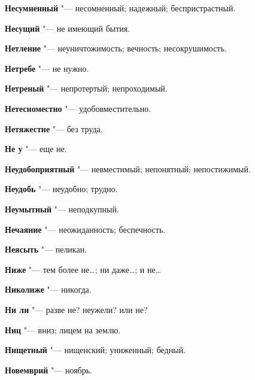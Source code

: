 \begin{mymulticols}{2}
\noindent\textbf{Несумненный} "--- несомненный; надежный; беспристрастный. 




\noindent\textbf{Несущий} "--- не имеющий бытия. 




\noindent\textbf{Нетление} "--- неуничтожимость; вечность; несокрушимость. 




\noindent\textbf{Нетребе} "--- не нужно. 




\noindent\textbf{Нетреный} "--- непротертый; непроходимый. 




\noindent\textbf{Нетесноместно} "--- удобовместительно. 




\noindent\textbf{Нетяжестне} "--- без труда. 




\noindent\textbf{Не у} "--- еще не. 




\noindent\textbf{Неудобоприятный} "--- невместимый; непонятный; непостижимый. 




\noindent\textbf{Неудобь} "--- неудобно; трудно. 




\noindent\textbf{Неумытный} "--- неподкупный. 




\noindent\textbf{Нечаяние} "--- неожиданность; беспечность. 




\noindent\textbf{Неясыть} "--- пеликан. 




\noindent\textbf{Ниже} "--- тем более не…; ни даже…; и не… 




\noindent\textbf{Николиже} "--- никогда. 




\noindent\textbf{Ни ли} "--- разве не? неужели? или не? 




\noindent\textbf{Ниц} "--- вниз; лицем на землю. 




\noindent\textbf{Нищетный} "--- нищенский; униженный; бедный. 




\noindent\textbf{Новемврий} "--- ноябрь. 





\end{mymulticols}
